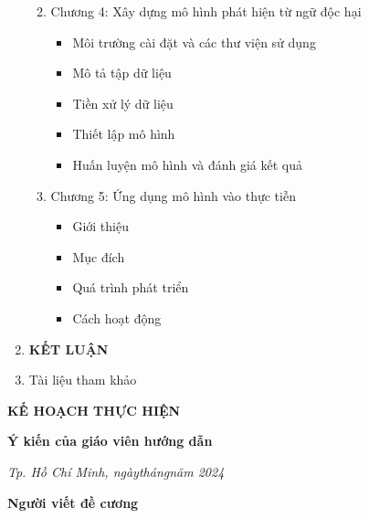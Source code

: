 \begin{enumerate}[label=\textbf{\arabic*.}]
\begin{enumerate}
\begin{itemize}
                    \end{itemize}
              \item Chương 4: Xây dựng mô hình phát hiện từ ngữ độc hại
                    \begin{itemize}
                        \item Môi trường cài đặt và các thư viện sử dụng
                        \item Mô tả tập dữ liệu
                        \item Tiền xử lý dữ liệu
                        \item Thiết lập mô hình
                        \item Huấn luyện mô hình và đánh giá kết quả
                    \end{itemize}
              \item Chương 5: Ứng dụng mô hình vào thực tiễn
                    \begin{itemize}
                        \item Giới thiệu
                        \item Mục đích
                        \item Quá trình phát triển
                        \item Cách hoạt động
                    \end{itemize}
          \end{enumerate}
    \item \textbf{KẾT LUẬN}
    \item Tài liệu tham khảo
\end{enumerate}

\newpage
\textbf{KẾ HOẠCH THỰC HIỆN}


\noindent\begin{minipage}[t]{0.42\textwidth}
    \centering
    \textbf{Ý kiến của giáo viên hướng dẫn}
\end{minipage}\hfil
\begin{minipage}[t]{0.57\textwidth}
    \centering
    \textit{Tp. Hồ Chí Minh, ngày\qquad tháng\qquad năm 2024}

    \textbf{Người viết đề cương}
\end{minipage}
\restoregeometry